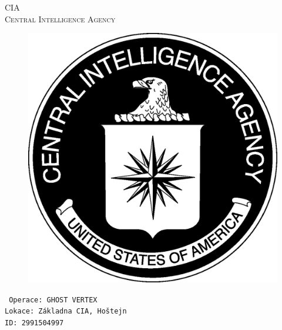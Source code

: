 \documentclass[a4paper, \fontheight]{article}
\begin{document}
	\begin{titlepage}
		\begin{center}		
			\textsc{{\fontsize{80}{0}\selectfont CIA}\\[2em]
				\Huge Central Intelligence Agency\\[2.5em]}
				
			\begin{figure}[H]
				\centering
				\includegraphics[scale=0.6]{sources/CIA_logo.eps}
			\end{figure}
		\end{center}	
		\vfill
		\noindent
		\texttt{\LARGE
				Operace: GHOST VERTEX\\[0.4em]
				Lokace: Základna CIA, Hoštejn\\[0.4em]
				ID: 2991504997}	
\end{titlepage} 
\end{document}

